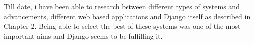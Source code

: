 \documentclass[../main.tex]{subfiles}
\begin{document}
\raggedright

Till date, i have been able to research between different types of systems and advancements, different web based applications and Django itself as described in Chapter 2. Being able to select the best of these systems was one of the most important aims and Django seems to be fulfilling it. 
\end{document}
